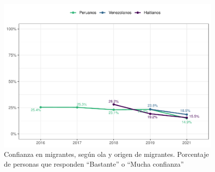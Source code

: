 \documentclass[
  12pt,
]{book}
\begin{document}
\begin{figure}

{\centering \includegraphics{reporte-elsoc_files/figure-latex/conf-wave-1} 

}

\caption{Confianza en migrantes, según ola y origen de migrantes. Porcentaje de personas que responden “Bastante” o “Mucha confianza”}\label{fig:conf-wave}
\end{figure}
\end{document}
